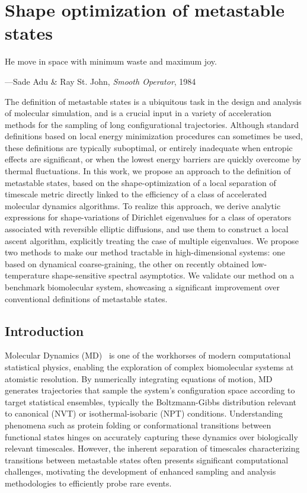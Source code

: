 \chapter{Shape optimization of metastable states}
\label{chap:shape_optimization}
\epigraph{He move in space with minimum waste and maximum joy.}{---Sade Adu \& Ray St. John, \textit{Smooth Operator}, 1984}

\begin{chapterabstract}
    The definition of metastable states is a ubiquitous task in the design and analysis of molecular simulation, and is a crucial input in a variety of acceleration methods for the sampling of long configurational trajectories.
    Although standard definitions based on local energy minimization procedures can sometimes be used, these definitions are typically suboptimal, or entirely inadequate when entropic effects are significant, or when the lowest energy barriers are quickly overcome by thermal fluctuations.
    In this work, we propose an approach to the definition of metastable states, based on the shape-optimization of a local separation of timescale metric directly linked to the efficiency of a class of accelerated molecular dynamics algorithms.
    To realize this approach, we derive analytic expressions for shape-variations of Dirichlet eigenvalues for a class of operators associated with reversible elliptic diffusions, and use them to construct a local ascent algorithm, explicitly treating the case of multiple eigenvalues.
    We propose two methods to make our method tractable in high-dimensional systems: one based on dynamical coarse-graining, the other on recently obtained low-temperature shape-sensitive spectral asymptotics.
    We validate our method on a benchmark biomolecular system, showcasing a significant improvement over conventional definitions of metastable states.
\end{chapterabstract}

\section{Introduction}
    \label{03:sec:intro}
    Molecular Dynamics (MD)~\cite{AT17,LM15} is one of the workhorses of modern computational statistical physics, enabling the exploration of complex biomolecular systems at atomistic resolution.
    By numerically integrating equations of motion, MD generates trajectories that sample the system's configuration space according to target statistical ensembles, typically the Boltzmann-Gibbs distribution relevant to canonical (NVT) or isothermal-isobaric (NPT) conditions.
    Understanding phenomena such as protein folding or conformational transitions between functional states hinges on accurately capturing these dynamics over biologically relevant timescales.
    However, the inherent separation of timescales characterizing transitions between metastable states often presents significant computational challenges, motivating the development of enhanced sampling and analysis methodologies to efficiently probe rare events.

